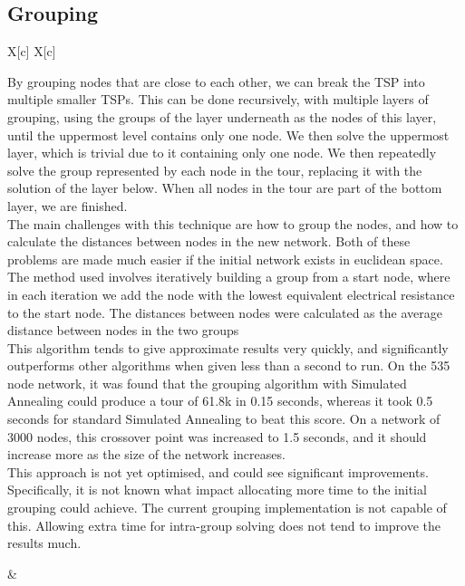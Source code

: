 \documentclass[a4paper, 11pt,table]{article}
\begin{document}
\subsection{Grouping}
\begin{tabu}{X[c] X[c]}
	\begin{minipage}{\linewidth}
By grouping nodes that are close to each other, we can break the TSP into multiple smaller TSPs. This can be done recursively, with multiple layers of grouping, using the groups of the layer underneath as the nodes of this layer, until the uppermost level contains only one node. We then solve the uppermost layer, which is trivial due to it containing only one node. We then repeatedly solve the group represented by each node in the tour, replacing it with the solution of the layer below. When all nodes in the tour are part of the bottom layer, we are finished.\\

The main challenges with this technique are how to group the nodes, and how to calculate the distances between nodes in the new network. Both of these problems are made much easier if the initial network exists in euclidean space. The method used involves iteratively building a group from a start node, where in each iteration we add the node with the lowest equivalent electrical resistance to the start node. The distances between nodes were calculated as the average distance between nodes in the two groups\\

This algorithm tends to give approximate results very quickly, and significantly outperforms other algorithms when given less than a second to run. On the 535 node network, it was found that the grouping algorithm with Simulated Annealing could produce a tour of 61.8k in 0.15 seconds, whereas it took 0.5 seconds for standard Simulated Annealing to beat this score. On a network of 3000 nodes, this crossover point was increased to 1.5 seconds, and it should increase more as the size of the network increases.\\

This approach is not yet optimised, and could see significant improvements. Specifically, it is not known what impact allocating more time to the initial grouping could achieve. The current grouping implementation is not capable of this. Allowing extra time for intra-group solving does not tend to improve the results much.\\
	\end{minipage}&


\end{tabu}
\end{document}
